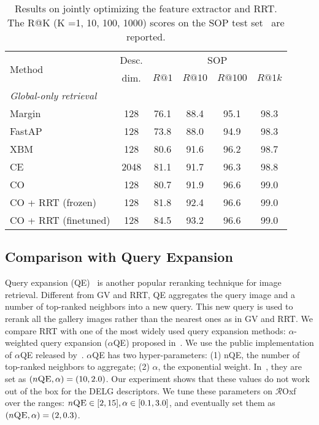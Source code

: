 \begin{table}[t]
\setlength{\tabcolsep}{1.5pt}
    \begin{tabular}{lccccc}
    \toprule
    \multirow{2}{*}{Method} & Desc. & \multicolumn{4}{c}{SOP} \\ 
& dim. & ${R@1}$ & ${R@10}$ & ${R@100}$ & ${R@1k}$ \\
    \midrule
    { \textit{Global-only retrieval}} \\
    Margin~\cite{margin2017,roth2020revisiting}  & 128 & 76.1 & 88.4 & 95.1 & 98.3\\
FastAP~\cite{fastap2019}  & 128 & 73.8 & 88.0 & 94.9 & 98.3\\
    XBM~\cite{XBM2020}  & 128 & 80.6 & 91.6 & 96.2 & 98.7 \\
    CE~\cite{CE2020} & 2048 & 81.1 & 91.7 & 96.3 & 98.8 \\
    \midrule
CO & 128 & 80.7 & 91.9 & \num[math-rm=\mathbf]{96.6} & \num[math-rm=\mathbf]{99.0}\\
    CO + RRT (frozen) & 128 & 81.8 & 92.4 & \num[math-rm=\mathbf]{96.6} &\num[math-rm=\mathbf]{99.0}  \\
    CO + RRT (finetuned)& 128 & \num[math-rm=\mathbf]{84.5} & \num[math-rm=\mathbf]{93.2} & \num[math-rm=\mathbf]{96.6} &\num[math-rm=\mathbf]{99.0}\\
    \bottomrule
    
    \end{tabular}
\vspace{-0.5em}
\caption{Results on jointly optimizing the feature extractor and RRT. The R@K (K =1, 10, 100, 1000) scores on the SOP test set~\cite{sop2016} are reported.
\vspace{-0.14in}
}
\label{tab:sop}
\end{table}

\subsection{Comparison with Query Expansion}

Query expansion (QE)~\cite{qe2007, qe2011, qe2014} is another popular reranking technique for image retrieval. 
Different from GV and RRT, QE aggregates the query image and a number of top-ranked neighbors into a new query.
This new query is used to rerank all the gallery images rather than the nearest ones as in GV and RRT.
We compare RRT with one of the most widely used query expansion methods: $\alpha$-weighted query expansion ($\alpha$QE) proposed in~\cite{finetune2016}.
We use the public implementation of $\alpha$QE
released by~\cite{listwise2019}.
$\alpha$QE has two hyper-parameters: (1) nQE, the number of top-ranked neighbors to aggregate; (2) $\alpha$, the exponential weight.
In~\cite{listwise2019}, they are set as $(n\textsc{QE}, \alpha) = (10, 2.0)$.
Our experiment shows that these values do not work out of the box for the DELG descriptors.
We tune these parameters on $\mathcal{R}$Oxf over the ranges: $n\textsc{QE} \in [2,15], \alpha \in [0.1,3.0]$, and eventually set them as $(n\textsc{QE}, \alpha) = (2, 0.3)$.

